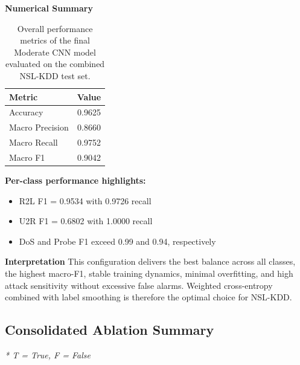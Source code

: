 \textbf{Numerical Summary}
\begin{table}[htbp]
\centering
\caption{Overall performance metrics of the final Moderate CNN model evaluated on the combined NSL-KDD test set.}
\label{tab:final-model-metrics}

\begin{tabular}{|l|c|}
\hline
\textbf{Metric} & \textbf{Value} \\ \hline
Accuracy & 0.9625 \\ \hline
Macro Precision & 0.8660 \\ \hline
Macro Recall & 0.9752 \\ \hline
Macro F1 & 0.9042 \\ \hline
\end{tabular}

\end{table}


\textbf{Per-class performance highlights:}
\begin{itemize}
    \item R2L F1 = 0.9534 with 0.9726 recall
    \item U2R F1 = 0.6802 with 1.0000 recall
    \item DoS and Probe F1 exceed 0.99 and 0.94, respectively
\end{itemize}

\textbf{Interpretation}  
This configuration delivers the best balance across all classes, the highest macro-F1, stable training dynamics, minimal overfitting, and high attack sensitivity without excessive false alarms. Weighted cross-entropy combined with label smoothing is therefore the optimal choice for NSL-KDD.

\subsection{Consolidated Ablation Summary}

\begin{table}[H]
\centering
\caption{Sensitivity of the Moderate CNN to Loss and Balancing Techniques}
\label{tab:ablation-summary}


\vspace{0.5em}
\noindent\textit{* T = True, F = False}
\end{table}

